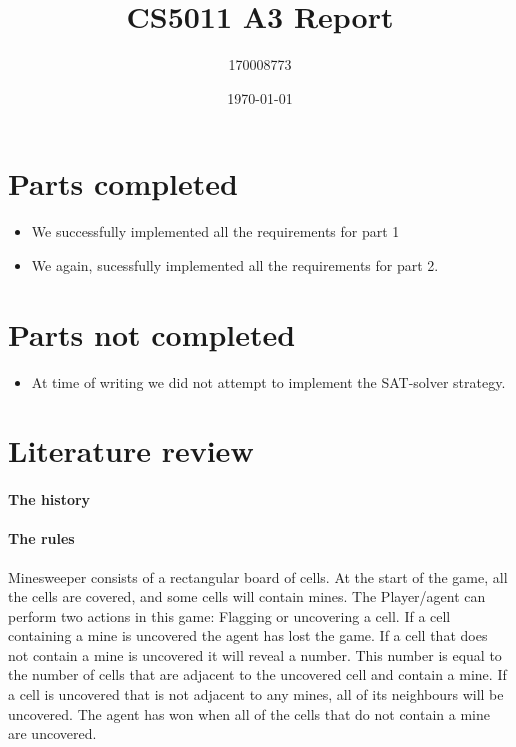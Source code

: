 \documentclass[british]{article}
\title{CS5011 A3 Report}
\author{170008773}
\date{\today}
\begin{document}
\maketitle


\section{Parts completed}
\label{completed}
\begin{itemize}
\item We successfully implemented all the requirements for part 1
\item We again, sucessfully implemented all the requirements for part 2.
\end{itemize}

\section{Parts not completed}
\label{uncompleted}
\begin{itemize}
\item At time of writing we did not attempt to implement the SAT-solver strategy.
\end{itemize}

\section{Literature review}
\label{litrev}


\paragraph{The history}

\paragraph{The rules} Minesweeper consists of a rectangular board of cells. At the start of the game, all the cells are covered, and some cells will contain mines. The Player/agent can perform two actions in this game: Flagging or uncovering a cell. If a cell containing a mine is uncovered the agent has lost the game. If a cell that does not contain a mine is uncovered it will reveal a number. This number is equal to the number of cells that are adjacent to the uncovered cell and contain a mine. If a cell is uncovered that is not adjacent to any mines, all of its neighbours will be uncovered. The agent has won when all of the cells that do not contain a mine are uncovered. 
\end{document}
